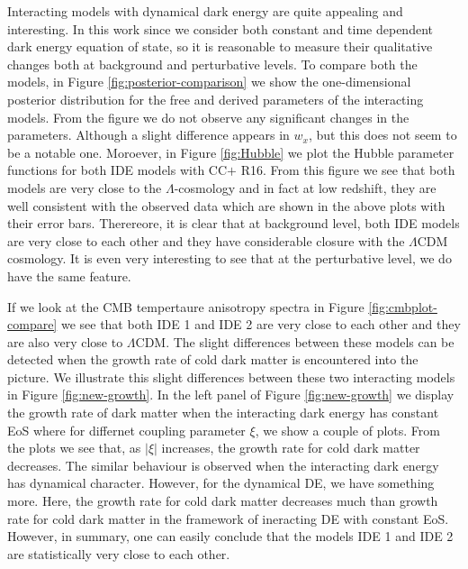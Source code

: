 \documentclass[superscriptaddress,oneolumn,secnumarabic,
amssymb,amsmath,nobibnotes,aps,prd,showpacs,nofootinbib]{revtex4}%
\begin{document}
Interacting models with dynamical dark energy are quite appealing and interesting. In this work since we consider both constant and time dependent dark energy equation of state, so it is reasonable to measure their qualitative changes both at background and perturbative levels. To compare both the models, in Figure \ref{fig:posterior-comparison} we show the one-dimensional posterior distribution for the free and derived parameters of the interacting models. From the figure we do not observe any significant changes in the parameters. Although a slight difference appears in $w_x$, but this does not seem to be a notable one. Moroever, in Figure \ref{fig:Hubble} we plot the Hubble parameter functions for both IDE models with CC$+$ R16. From this figure we see that both models are very close to the $\Lambda$-cosmology and in fact at low redshift, they are well consistent with the observed data which are shown in the above plots with their error bars. Therereore, it is clear that at background level, both IDE models are very close to each other and they have considerable closure with the $\Lambda$CDM cosmology. It is even very interesting to see that at the perturbative level, we do have the same feature.


If we look at the CMB tempertaure anisotropy spectra in Figure \ref{fig:cmbplot-compare} we see that both IDE 1 and IDE 2 are very close to each other and they are also very close to $\Lambda$CDM. The slight differences between these models can be detected when the growth rate of cold dark matter is encountered into the picture. We illustrate this slight differences between these two interacting models in Figure \ref{fig:new-growth}. In the left panel of Figure \ref{fig:new-growth} we display the growth rate of dark matter when the interacting dark energy has constant EoS where for differnet coupling parameter $\xi$, we show  a couple of plots. From the plots we see that, as $|\xi|$ increases, the growth rate for cold dark matter decreases. The similar behaviour is observed when the interacting dark energy has dynamical character. However, for the dynamical DE,  we have something more. Here, the growth rate for cold dark matter decreases much than growth rate for cold dark matter in the framework of ineracting DE with constant EoS. However, in summary, one can easily conclude that the models IDE 1 and IDE 2 are statistically very close to each other.
\end{document}
